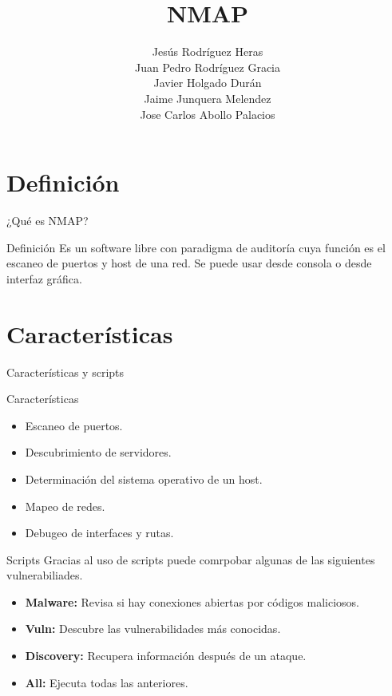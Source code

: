 \documentclass{beamer}
\title{NMAP}
\author{Jesús Rodríguez Heras \\ Juan Pedro Rodríguez Gracia \\ Javier Holgado Durán \\ Jaime Junquera Melendez \\ Jose Carlos Abollo Palacios}
\begin{document}
\begin{frame}
  \titlepage
  
\end{frame}



\section{Definición}
\begin{frame}{¿Qué es NMAP?}
	\begin{block}{Definición}
		Es un software libre con paradigma de auditoría cuya función es el escaneo de puertos y host de una red. Se puede usar desde consola o desde interfaz gráfica.
	\end{block}
\end{frame}

\section{Características}
\begin{frame}{Características y scripts}
\begin{block}{Características}
	\begin{itemize}
		\item Escaneo de puertos.
		\item Descubrimiento de servidores.
		\item Determinación del sistema operativo de un host.
		\item Mapeo de redes.
		\item Debugeo de interfaces y rutas.
	\end{itemize}
\end{block}
	\begin{block}{Scripts}
		Gracias al uso de scripts puede comrpobar algunas de las siguientes vulnerabiliades.
		\begin{itemize}
			\item \textbf{Malware:} Revisa si hay conexiones abiertas por códigos maliciosos.
			\item \textbf{Vuln:} Descubre las vulnerabilidades más conocidas.
			\item \textbf{Discovery:} Recupera información después de un ataque.
			\item \textbf{All:} Ejecuta todas las anteriores.
		\end{itemize}
	\end{block}
\end{frame}
\end{document}
